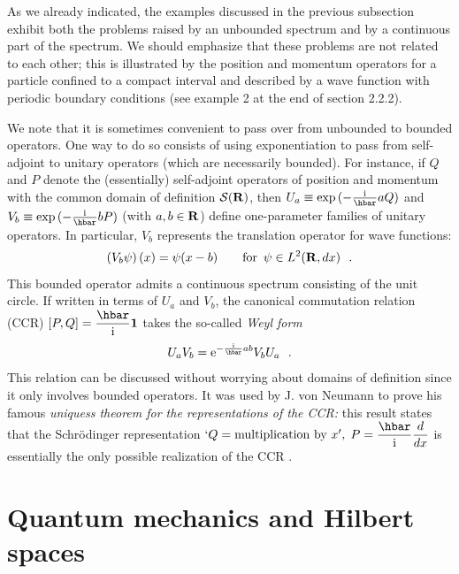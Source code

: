 \documentclass[12pt]{report}
\begin{document}
As we already indicated, the examples discussed in the previous subsection 
exhibit both the problems raised by an unbounded 
spectrum and by 
a continuous part of the spectrum. 
We should 
emphasize that these problems are not related to each other;
this is illustrated by the position and momentum operators for 
a particle confined to a compact interval and described by a wave function
 with periodic boundary conditions 
(see example 2 at the end of section 2.2.2).

We note that it is sometimes convenient to pass over from unbounded
to bounded operators. One way to do so consists of using exponentiation
to pass from self-adjoint to unitary operators (which are necessarily 
bounded). 
For instance, if $Q$ and $P$ denote the (essentially) self-adjoint
operators of position and momentum 
with the common domain of definition 
${\cal S}({\bf R})$, then 
$U_a \equiv {\rm exp} \, ( -{\rmi \over \hbar} a Q)$ and 
$V_b \equiv {\rm exp} \, ( -{\rmi \over \hbar} b P)$ (with $a,b \in {\bf R}$)
 define one-parameter families of unitary operators. 
In particular, $V_b$ represents the translation operator for 
wave functions:
\[
\left( V_b \psi \right) (x) = \psi (x-b) 
\qquad {\rm for} \ \, \psi \in {L^2 ({{\bf R}},dx)}
\ \ .
\]
This bounded operator
admits a continuous spectrum consisting of the unit circle.  
If written in terms of $U_a$ and $V_b$, 
the canonical commutation relation (CCR)
$[P,Q ] = \ds{\hbar \over \rmi} {\bf 1}$ takes the so-called
{\em Weyl form} 
\begin{equation}
U_a V_b = \rme ^{-{\rmi \over \hbar} ab} V_b U_a
\ \ .
\end{equation}   
This relation can be discussed
without worrying about domains of definition
since it only involves bounded operators.
It was used by J. von Neumann to prove his famous 
{\em uniquess theorem for the representations of the CCR:} 
this result states that the 
Schr\"odinger representation 
$`Q= \mbox{multiplication by} \ x', 
\;  P = \ds{\hbar \over \ri}\ds{d \over dx}$ 
is essentially the only possible realization of the CCR \cite{rs,gap}.  





\chapter{Quantum mechanics and Hilbert spaces}
 
\end{document}
